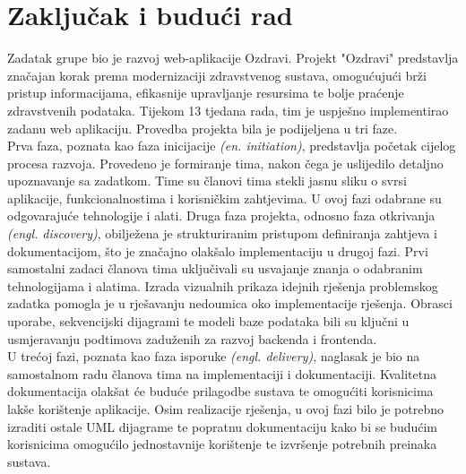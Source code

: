 \chapter{Zaključak i budući rad}
		
		
		

		 Zadatak grupe bio je razvoj web-aplikacije Ozdravi. Projekt "Ozdravi" predstavlja značajan korak prema modernizaciji zdravstvenog sustava, omogućujući brži pristup informacijama, efikasnije upravljanje resursima te bolje praćenje zdravstvenih podataka. Tijekom 13 tjedana rada, tim je uspješno implementirao zadanu web aplikaciju. Provedba projekta bila je podijeljena u tri faze. \\
		 Prva faza, poznata kao faza inicijacije \textit{(en. initiation)}, predstavlja početak cijelog procesa razvoja. Provedeno je formiranje tima, nakon čega je uslijedilo detaljno upoznavanje sa zadatkom. Time su članovi tima stekli jasnu sliku o svrsi aplikacije, funkcionalnostima i korisničkim zahtjevima. U ovoj fazi odabrane su odgovarajuće tehnologije i alati.   
		 Druga faza projekta, odnosno faza otkrivanja \textit{(engl. discovery)}, obilježena je strukturiranim pristupom definiranja zahtjeva i dokumentacijom, što je značajno olakšalo implementaciju u drugoj fazi. Prvi samostalni zadaci članova tima uključivali su usvajanje znanja o odabranim tehnologijama i alatima. Izrada vizualnih prikaza idejnih rješenja problemskog zadatka pomogla je u rješavanju nedoumica oko implementacije rješenja. Obrasci uporabe, sekvencijski dijagrami te modeli baze podataka bili su ključni u usmjeravanju podtimova zaduženih za razvoj backenda i frontenda. \\
		 U trećoj fazi, poznata kao faza isporuke \textit{(engl. delivery)}, naglasak je bio na samostalnom radu članova tima na implementaciji i dokumentaciji. Kvalitetna dokumentacija olakšat će buduće prilagodbe sustava te omogućiti korisnicima lakše korištenje aplikacije. Osim realizacije rješenja, u ovoj fazi bilo je potrebno izraditi ostale UML dijagrame te popratnu dokumentaciju kako bi se budućim korisnicima omogućilo jednostavnije korištenje te izvršenje potrebnih preinaka sustava. 
